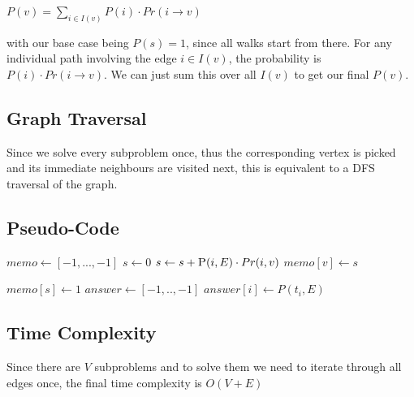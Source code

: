 \documentclass{article}
\begin{document}
$P(v) = \sum_{i \in I(v)}P(i)\cdot Pr(i \rightarrow v)$

with our base case being $P(s) = 1$, since all walks start from there. For any individual path involving the edge $i\in I(v)$, the probability is $P(i)\cdot Pr(i \rightarrow v)$. We can just sum this over all $I(v)$ to get our final $P(v)$.

\subsection{Graph Traversal}

Since we solve every subproblem once, thus the corresponding vertex is picked and its immediate neighbours are visited next, this is equivalent to a DFS traversal of the graph.

\subsection{Pseudo-Code}

\begin{algorithmic}[1]
\State $memo \gets [-1,...,-1]$ 
\State $s \gets 0$
\State $s \gets s + \Call{P}{i,E}\cdot Pr(i,v)$
\EndFor
\State $memo[v] \gets s$
\EndIf

\State {}
\EndProcedure

\State $memo[s] \gets 1$
\State $answer \gets [-1,..,-1]$
\State $answer[i] \gets P(t_i,E)$
\EndFor

\State {}
\EndProcedure
\end{algorithmic}

\subsection{Time Complexity}

Since there are $V$ subproblems and to solve them we need to iterate through all edges once, the final time complexity is $O(V+E)$
\end{document}
